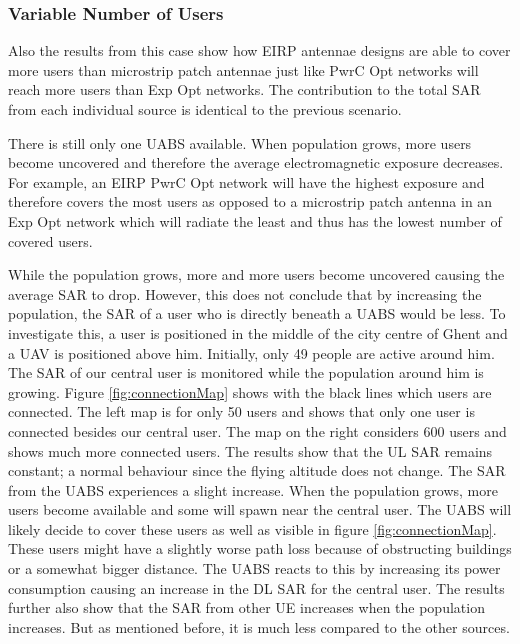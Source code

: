 \documentclass[twocolumn]{phdsymp} %
\begin{document}
\subsubsection{Variable Number of Users}

Also the results from this case show how EIRP antennae designs are able to cover more users than microstrip patch antennae
just like \gls{PwrC Opt} networks will reach more users than \gls{Exp Opt} networks.
The contribution to the total \gls{SAR} from each individual source is identical to the previous scenario. 

There is still only one \gls{UABS} available. When population grows, more users become uncovered and 
therefore the average electromagnetic exposure decreases.
For example, an EIRP \gls{PwrC Opt} network
will have the highest exposure and therefore covers the most users as opposed to a microstrip patch antenna in 
an \gls{Exp Opt} network which will radiate the least and thus has the lowest number of covered users.

While the population grows, more and more users become uncovered causing the average SAR to drop. 
However, this does not conclude that by increasing the population, the SAR of a user who is directly beneath a \gls{UABS} would be less.
To investigate this, a user is positioned in the middle of the city centre of Ghent and a \gls{UAV} is positioned above him. Initially, only 
49 people are active around him. The \gls{SAR} of our central user is monitored while the population around him is growing.
Figure \ref{fig:connectionMap} shows with the black lines which users are connected. The left map is for only 50 users and 
shows that only one user is connected besides our central user. The map on the right considers 600 users and shows much more connected users.
The results show that the \gls{UL} \gls{SAR} remains constant; a normal behaviour since the flying altitude does not change.
The \gls{SAR} from the \gls{UABS} experiences a slight increase. When the population grows, more users become available 
and some will spawn near the central user. The \gls{UABS} will likely decide to cover these users as well as visible in figure \ref{fig:connectionMap}.
These users might have a slightly 
worse path loss because of obstructing buildings or a somewhat bigger distance. The \gls{UABS} reacts to this by increasing 
its power consumption causing an increase in the \gls{DL} \gls{SAR} for the central user. The results further also show 
that the \gls{SAR} from other \gls{UE} increases when the population increases. But as mentioned  before, it is much less 
compared to the other sources.
\end{document}
